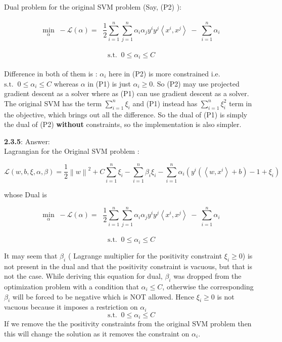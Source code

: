 \documentclass[a4paper,11pt]{article}
\begin{document}
\begin{mlsolution}
Dual problem for the original SVM problem (Say, (P2) ):\\\\
\[
\underset{\alpha}{\text{min}} \;\; - \mathcal{L}\left ( \alpha \right ) = \; \;\frac{1}{2}\sum_{i=1}^{n}\sum_{j=1}^{n}\alpha_{i}\alpha_{j}y^{i}y^{j}\left \langle x^{i}, x^{j} \right \rangle \;-\; \sum_{i=1}^{n}\alpha_{i}
\]\\
\[\text{s.t.} \;\;0 \leq \alpha_{i} \leq C\]\\

Difference in both of them is : $\alpha_{i}$ here in (P2) is more constrained i.e. $\text{s.t.} \;\;0 \leq \alpha_{i} \leq C$ whereas $\alpha$ in (P1) is just $\alpha_{i} \geq 0$. So (P2) may use projected gradient descent as a solver where as (P1) can use gradient descent as a solver.\\

The original SVM has the term $\sum_{i=1}^{n}\xi_{i}$ and (P1) instead has $\sum_{i=1}^{n}\xi_{i}^{2}$ term in the objective, which brings out all the difference. So the dual of (P1) is simply the dual of (P2) \textbf{without} constraints, so the implementation is also simpler. 
\newpage

\textbf{2.3.5}: Answer:\\

Lagrangian for the Original SVM problem : 

\[
\mathcal{L}\left ( w, b, \xi, \alpha, \beta \right ) =
\frac{1}{2} \left \| w \right \|^{2} + C \sum_{i=1}^{n} \xi_{i} - \sum_{i=1}^{n} \beta_{i}\xi_{i} - \sum_{i=1}^{n} \alpha_i\left ( y^{i}\left ( \left \langle w, x^{i} \right \rangle + b \right ) - 1 + \xi_{i} \right )
\]

whose Dual is 

\[
\underset{\alpha}{\text{min}} \;\; - \mathcal{L}\left ( \alpha \right ) = \; \;\frac{1}{2}\sum_{i=1}^{n}\sum_{j=1}^{n}\alpha_{i}\alpha_{j}y^{i}y^{j}\left \langle x^{i}, x^{j} \right \rangle \;-\; \sum_{i=1}^{n}\alpha_{i}
\]\\
\[\text{s.t.} \;\;0 \leq \alpha_{i} \leq C\]

It may seem that $\beta_{i}$ ( Lagrange multiplier for the positivity constraint $\xi_{i} \geq 0$) is not present in the dual and that the positivity constraint is vacuous, but that is not the case. While deriving this equation for dual, $\beta_{i}$ was dropped from the optimization problem with a condition that $\alpha_{i} \leq C$, otherwise the corresponding $\beta_{i}$ will be forced to be negative which is NOT allowed. Hence $\xi_{i} \geq 0$ is not vacuous because it imposes a restriction on $\alpha_{i}$ \; \[\text{s.t.} \;\;0 \leq \alpha_{i} \leq C\] If we remove the the positivity constraints from the original SVM problem then this will change the solution as it removes the constraint on $\alpha_{i}$. 
\end{mlsolution}
\end{document}
